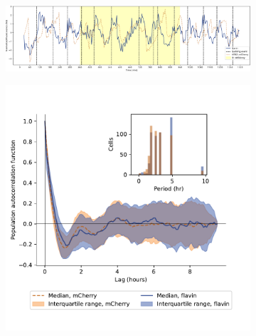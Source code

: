 \begin{figure}
  \centering
  \begin{subfigure}[htpb]{1.0\textwidth}
   \centering
   \includegraphics[width=\textwidth]{htb2mCherry_613_plots_single_htb2mCherry012_90_2_adapted.pdf}
   \caption{
   }
   \label{fig:biology-kdeficient-single}
  \end{subfigure}

  \begin{subfigure}[htpb]{0.7\textwidth}
   \centering
   \includegraphics[width=\textwidth]{htb2mCherry_613_12.pdf}
   \caption{
   }
   \label{fig:biology-kdeficient-acf}
  \end{subfigure}


\end{figure}
